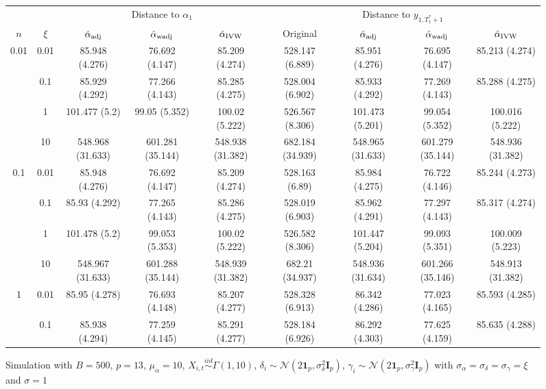 \documentclass[11pt]{article}
\newcommand{\simiid}{\stackrel{iid}{\sim}} %
\def\normal#1#2{\mathcal{N}(#1,#2)} %
\theoremstyle{definition}
\begin{document}
\begin{sidewaysfigure}
\centering
\caption{Simulation  with $B = 500$, $p = 13$, $\mu_{\alpha}=10$, $X_{i,t} \simiid \Gamma(1,10)$, $\delta_i \sim \normal{2\mathbf{1}_p}{\sigma^2_{\delta}\mathbf{I}_p}$, $\gamma_i \sim \normal{2\mathbf{1}_p}{\sigma^2_{\gamma}\mathbf{I}_p}$ with $\sigma_{\alpha} = \sigma_{\delta}=\sigma_{\gamma}=\xi$ and $\sigma = 1$}
\begin{tabular}{cc|ccc|cccc}
  & & \multicolumn{3}{c|}{Distance to $\alpha_1$}  & \multicolumn{4}{c}{Distance to $y_{1, T_1^*+1}$}  \\ 
  $n$   & $\xi$ & $\hat{\alpha}_{\rm adj}$  & $\hat{\alpha}_{\rm wadj}$ & $\hat{\alpha}_{\rm IVW}$ & Original & $\hat{\alpha}_{\rm adj}$ & $\hat{\alpha}_{\rm wadj}$ & $\hat{\alpha}_{\rm IVW}$\\[.3cm]  
  \hline
\multirow{4}{*}{0.01} & 0.01 & 85.948 (4.276) & 76.692 (4.147) & 85.209 (4.274) & 528.147 (6.889) & 85.951 (4.276) & 76.695 (4.147) & 85.213 (4.274) \\ 
  & 0.1 & 85.929 (4.292) & 77.266 (4.143) & 85.285 (4.275) & 528.004 (6.902) & 85.933 (4.292) & 77.269 (4.143) & 85.288 (4.275) \\ 
    & 1 & 101.477 (5.2) & 99.05 (5.352) & 100.02 (5.222) & 526.567 (8.306) & 101.473 (5.201) & 99.054 (5.352) & 100.016 (5.222) \\ 
    & 10 & 548.968 (31.633) & 601.281 (35.144) & 548.938 (31.382) & 682.184 (34.939) & 548.965 (31.633) & 601.279 (35.144) & 548.936 (31.382) \\[.3cm]  
   \multirow{4}{*}{0.1} & 0.01 & 85.948 (4.276) & 76.692 (4.147) & 85.209 (4.274) & 528.163 (6.89) & 85.984 (4.275) & 76.722 (4.146) & 85.244 (4.273) \\ 
    & 0.1 & 85.93 (4.292) & 77.265 (4.143) & 85.286 (4.275) & 528.019 (6.903) & 85.962 (4.291) & 77.297 (4.143) & 85.317 (4.274) \\ 
    & 1 & 101.478 (5.2) & 99.053 (5.353) & 100.02 (5.222) & 526.582 (8.306) & 101.447 (5.204) & 99.093 (5.351) & 100.009 (5.223) \\ 
    & 10 & 548.967 (31.633) & 601.288 (35.144) & 548.939 (31.382) & 682.21 (34.937) & 548.936 (31.634) & 601.266 (35.146) & 548.913 (31.382) \\[.3cm]  
   \multirow{4}{*}{1} & 0.01 & 85.95 (4.278) & 76.693 (4.148) & 85.207 (4.277) & 528.328 (6.913) & 86.342 (4.286) & 77.023 (4.165) & 85.593 (4.285) \\ 
    & 0.1 & 85.938 (4.294) & 77.259 (4.145) & 85.291 (4.277) & 528.184 (6.926) & 86.292 (4.303) & 77.625 (4.159) & 85.635 (4.288) \\ 

\end{tabular}
\end{sidewaysfigure}
\end{document}
